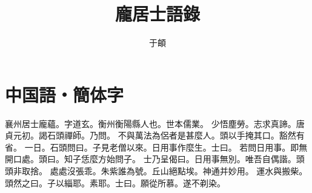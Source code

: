 \documentclass[a5j,12pt]{ltjtarticle}
\title{龐居士語錄}
\author{于頔}
\begin{document}
\maketitle

\section{中国語・簡体字}

襄州居士龐蘊。字道玄。衡州衡陽縣人也。世本儒業。
少悟塵勞。志求真諦。唐貞元初。謁石頭禪師。乃問。
不與萬法為侶者是甚麼人。頭以手掩其口。豁然有省。
一日。石頭問曰。子見老僧以來。日用事作麼生。士曰。
若問日用事。即無開口處。頭曰。知子恁麼方始問子。
士乃呈偈曰。日用事無別。唯吾自偶諧。頭頭非取捨。
處處沒張乖。朱紫誰為號。丘山絕點埃。神通并妙用。
運水與搬柴。頭然之曰。子以緇耶。素耶。士曰。願從所慕。遂不剃染。
\end{document}
